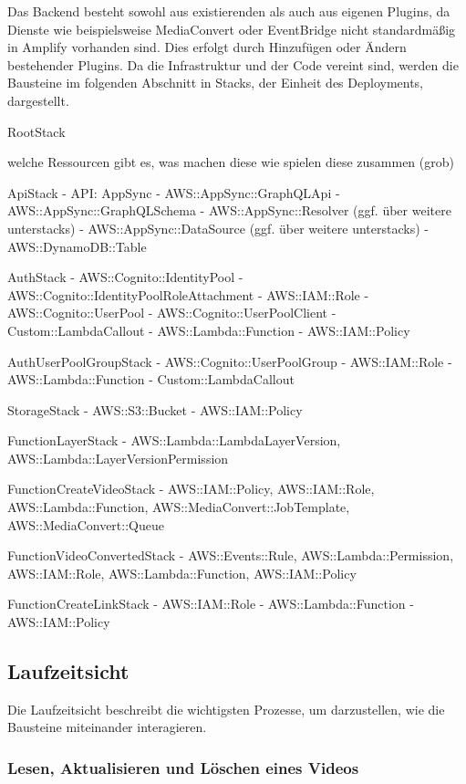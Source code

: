 Das Backend besteht sowohl aus existierenden als auch aus eigenen Plugins, da Dienste wie beispielsweise MediaConvert oder EventBridge nicht standardmäßig in Amplify vorhanden sind. Dies erfolgt durch Hinzufügen oder Ändern bestehender Plugins. Da die Infrastruktur und der Code vereint sind, werden die Bausteine im folgenden Abschnitt in Stacks, der Einheit des Deployments, dargestellt.

RootStack

welche Ressourcen gibt es,
was machen diese
wie spielen diese zusammen (grob)

ApiStack
  - API: AppSync
  - AWS::AppSync::GraphQLApi
  - AWS::AppSync::GraphQLSchema
  - AWS::AppSync::Resolver (ggf. über weitere unterstacks)
  - AWS::AppSync::DataSource (ggf. über weitere unterstacks)
  - AWS::DynamoDB::Table

AuthStack
  - AWS::Cognito::IdentityPool
  - AWS::Cognito::IdentityPoolRoleAttachment
  - AWS::IAM::Role
  - AWS::Cognito::UserPool
  - AWS::Cognito::UserPoolClient
  - Custom::LambdaCallout
  - AWS::Lambda::Function
  - AWS::IAM::Policy

AuthUserPoolGroupStack
  - AWS::Cognito::UserPoolGroup
  - AWS::IAM::Role
  - AWS::Lambda::Function
  - Custom::LambdaCallout

StorageStack
  - AWS::S3::Bucket
  - AWS::IAM::Policy

FunctionLayerStack
  - AWS::Lambda::LambdaLayerVersion, AWS::Lambda::LayerVersionPermission

FunctionCreateVideoStack
  - AWS::IAM::Policy, AWS::IAM::Role, AWS::Lambda::Function, AWS::MediaConvert::JobTemplate, AWS::MediaConvert::Queue

FunctionVideoConvertedStack
- AWS::Events::Rule, AWS::Lambda::Permission, AWS::IAM::Role, AWS::Lambda::Function, AWS::IAM::Policy

FunctionCreateLinkStack
- AWS::IAM::Role
- AWS::Lambda::Function
- AWS::IAM::Policy

\subsection{Laufzeitsicht}

Die Laufzeitsicht beschreibt die wichtigsten Prozesse, um darzustellen, wie die Bausteine miteinander interagieren.

\subsubsection{Lesen, Aktualisieren und Löschen eines Videos}


